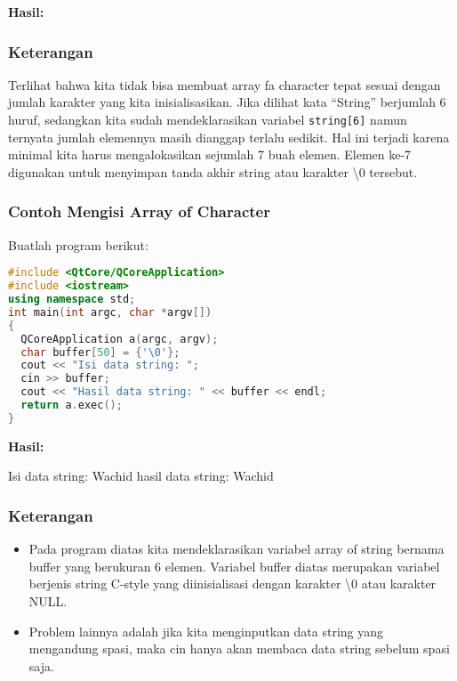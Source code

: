 \textbf{Hasil:}

\begin{figure}[htbp]
\centering
{}

\end{figure}

\subsubsection*{Keterangan}

Terlihat bahwa kita tidak bisa membuat array fa character tepat sesuai
dengan jumlah karakter yang kita inisialisasikan. Jika dilihat kata
``String'' berjumlah 6 huruf, sedangkan kita sudah mendeklarasikan
variabel \texttt{string{[}6{]}} namun ternyata jumlah elemennya masih
dianggap terlalu sedikit. Hal ini terjadi karena minimal kita harus
mengalokasikan sejumlah 7 buah elemen. Elemen ke-7 digunakan untuk
menyimpan tanda akhir string atau karakter \textbackslash0 tersebut.

\subsubsection*{Contoh  Mengisi Array of Character}

Buatlah program berikut:

\begin{lstlisting}[language=c++, caption=Mengisi Array of Character, label=contoh3-17]
#include <QtCore/QCoreApplication>
#include <iostream>
using namespace std;
int main(int argc, char *argv[])
{
  QCoreApplication a(argc, argv);
  char buffer[50] = {'\0'};
  cout << "Isi data string: ";
  cin >> buffer;
  cout << "Hasil data string: " << buffer << endl;
  return a.exec();
}
\end{lstlisting}

\textbf{Hasil:}
\begin{lcverbatim}
Isi data string: Wachid
hasil data string: Wachid
\end{lcverbatim}


\subsubsection*{Keterangan}

\begin{itemize}

\item
  Pada program diatas kita mendeklarasikan variabel array of string
  bernama buffer yang berukuran 6 elemen. Variabel buffer diatas
  merupakan variabel berjenis string C-style yang diinisialisasi dengan
  karakter \textbackslash{0} atau karakter NULL.
\item
  Problem lainnya adalah jika kita menginputkan data string yang
  mengandung spasi, maka cin hanya akan membaca data string sebelum
  spasi saja.
\end{itemize}

